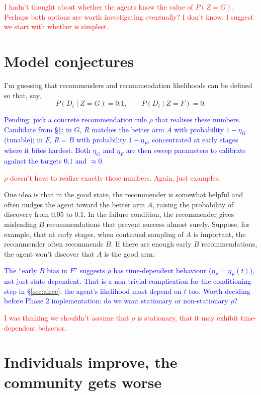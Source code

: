 \documentclass[12pt]{article}
\newcommand{\ignacio}[1]{\textcolor{blue}{#1}}
\newcommand{\michael}[1]{\textcolor{red}{#1}}
\begin{document}
\michael{I hadn't thought about whether the agents know the value of $P(Z=G)$. Perhaps both options are worth investigating eventually? I don't know. I suggest we start with whether is simplest.}

\section{Model conjectures}
\label{sec:conj}

I'm guessing that recommenders and recommendation likelihoods can be defined so that, say,
\[
  P(D_i \mid Z = G) = 0.1, \qquad P(D_i \mid Z = F) = 0.
\]

\ignacio{Pending: pick a concrete recommendation rule $\rho$ that realises these numbers. Candidate from \S\ref{sec:conj}: in $G$, $R$ matches the better arm $A$ with probability $1 - \eta_G$ (tunable); in $F$, $R = B$ with probability $1 - \eta_F$, concentrated at early stages where it bites hardest. Both $\eta_G$ and $\eta_F$ are then sweep parameters to calibrate against the targets $0.1$ and $\approx 0$.}

\michael{$\rho$ doesn't have to realize exactly these numbers. Again, just examples. }

One idea is that in the good state, the recommender is somewhat helpful and often nudges the agent toward the better arm $A$, raising the probability of discovery from $0.05$ to $0.1$.
In the failure condition, the recommender gives misleading $B$ recommendations that prevent success almost surely.
Suppose, for example, that at early stages, when continued sampling of $A$ is important, the recommender often recommends $B$.
If there are enough early $B$ recommendations, the agent won't discover that $A$ is the good arm.

\ignacio{The ``early $B$ bias in $F$'' suggests $\rho$ has time-dependent behaviour ($\eta_F = \eta_F(t)$), not just state-dependent. That is a non-trivial complication for the conditioning step in \S\ref{sec:airec}: the agent's likelihood must depend on $t$ too. Worth deciding before Phase 2 implementation: do we want stationary or non-stationary $\rho$?}

\michael{I was thinking we shouldn't assume that $\rho$ is stationary, that it may exhibit time-dependent behavior.}

\section{Individuals improve, the community gets worse}
\label{sec:improve}
\end{document}
